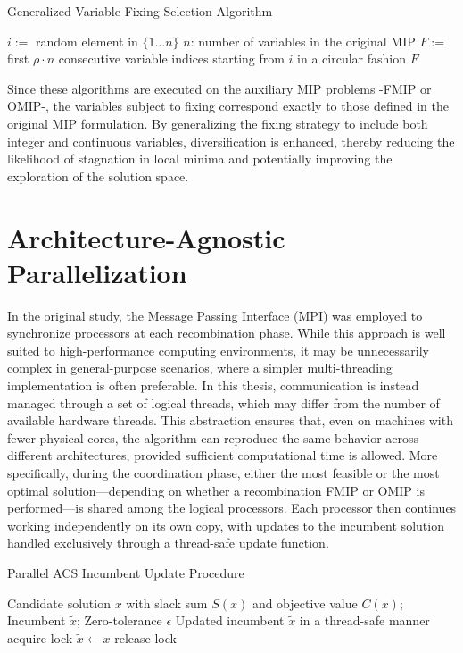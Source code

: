 \begin{algorithm}[H]
\caption{Generalized Variable Fixing Selection Algorithm}\label{alg:gen_variable_fixing}
\begin{algorithmic}[1]
    \State $i :=$ random element in $\{1\dots n\}$ \Comment $n$: number of variables in the original MIP 
    \State $F :=$ first $\rho \cdot n$ consecutive  variable indices starting from $i$ in a circular fashion
    \State \Return $F$
\EndFunction
\end{algorithmic}
\end{algorithm}
Since these algorithms are executed on the auxiliary MIP problems -FMIP or OMIP-, the variables subject to fixing correspond exactly to those defined in the original MIP formulation.  
By generalizing the fixing strategy to include both integer and continuous variables, diversification is enhanced, thereby reducing the likelihood of stagnation in local minima and potentially improving the exploration of the solution space.

\section{Architecture-Agnostic Parallelization}
In the original study, the Message Passing Interface (MPI) was employed to synchronize processors at each recombination phase. While this approach is well suited to high-performance computing environments, it may be unnecessarily complex in general-purpose scenarios, where a simpler multi-threading implementation is often preferable.  
In this thesis, communication is instead managed through a set of logical threads, which may differ from the number of available hardware threads. This abstraction ensures that, even on machines with fewer physical cores, the algorithm can reproduce the same behavior across different architectures, provided sufficient computational time is allowed.  
More specifically, during the coordination phase, either the most feasible or the most optimal solution—depending on whether a recombination FMIP or OMIP is performed—is shared among the logical processors. Each processor then continues working independently on its own copy, with updates to the incumbent solution handled exclusively through a thread-safe update function.  
\begin{algorithm}[H]
\caption{Parallel ACS Incumbent Update Procedure}
\begin{algorithmic}[1]
\Require Candidate solution $x$ with slack sum $S(x)$ and objective value $C(x)$; Incumbent $\tilde{x}$; Zero-tolerance $\epsilon$
\Ensure Updated incumbent $\tilde{x}$ in a thread-safe manner
    \State acquire lock
        \State $\tilde{x} \gets x$
    \EndIf
    \State release lock
\EndFunction
\end{algorithmic}
\end{algorithm}


